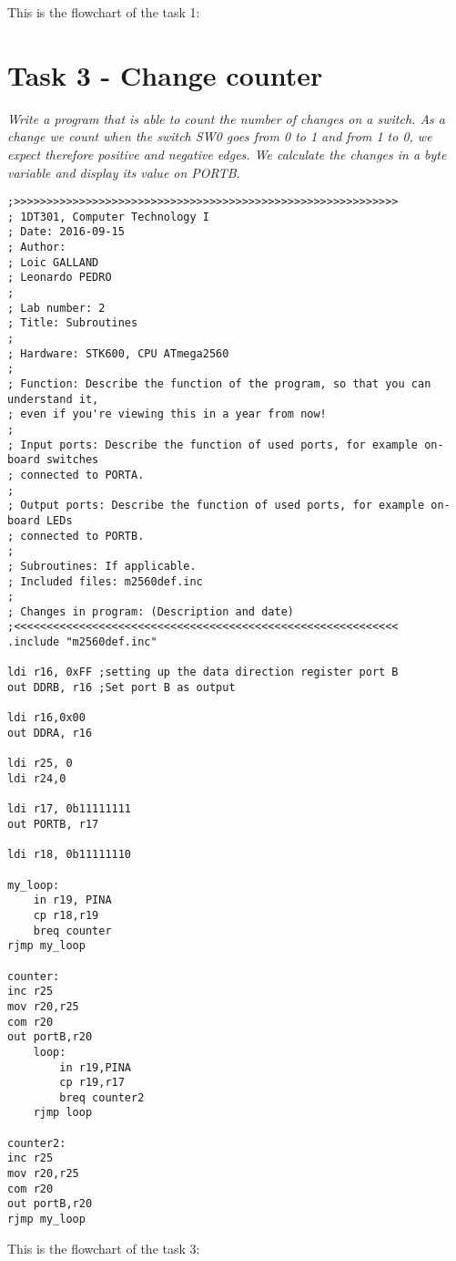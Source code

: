 \documentclass[a4paper,12pt]{article}
\begin{document}
\newpage
This is the flowchart of the task 1:
\begin{center}
\end{center}


\section{Task 3 - Change counter}
\textit{Write a program that is able to count the number of changes on a switch. As a change we count
when the switch SW0 goes from 0 to 1 and from 1 to 0, we expect therefore positive and negative
edges. We calculate the changes in a byte variable and display its value on PORTB.}

\lstset{style=Asm}
\begin{lstlisting}
;>>>>>>>>>>>>>>>>>>>>>>>>>>>>>>>>>>>>>>>>>>>>>>>>>>>>>>>>>>>
; 1DT301, Computer Technology I
; Date: 2016-09-15
; Author:
; Loic GALLAND
; Leonardo PEDRO
;
; Lab number: 2
; Title: Subroutines
;
; Hardware: STK600, CPU ATmega2560
;
; Function: Describe the function of the program, so that you can understand it,
; even if you're viewing this in a year from now!
;
; Input ports: Describe the function of used ports, for example on-board switches
; connected to PORTA.
;
; Output ports: Describe the function of used ports, for example on-board LEDs
; connected to PORTB.
;
; Subroutines: If applicable.
; Included files: m2560def.inc
;
; Changes in program: (Description and date)
;<<<<<<<<<<<<<<<<<<<<<<<<<<<<<<<<<<<<<<<<<<<<<<<<<<<<<<<<<<<
.include "m2560def.inc"

ldi r16, 0xFF ;setting up the data direction register port B
out DDRB, r16 ;Set port B as output

ldi r16,0x00
out DDRA, r16

ldi r25, 0
ldi r24,0

ldi r17, 0b11111111
out PORTB, r17

ldi r18, 0b11111110

my_loop:
	in r19, PINA
	cp r18,r19
	breq counter
rjmp my_loop

counter:
inc r25
mov r20,r25
com r20
out portB,r20
	loop:
		in r19,PINA
		cp r19,r17
		breq counter2
	rjmp loop

counter2:
inc r25
mov r20,r25
com r20
out portB,r20
rjmp my_loop
\end{lstlisting}

\newpage
This is the flowchart of the task 3:
\begin{center}
\end{center}
\end{document}
